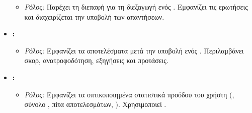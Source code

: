 \begin{itemize}[leftmargin=*, noitemsep]
        \begin{itemize}[leftmargin=+, noitemsep]
            \item \textit{Ρόλος:} Παρέχει τη διεπαφή για τη διεξαγωγή ενός . Εμφανίζει τις ερωτήσεις και διαχειρίζεται την υποβολή των απαντήσεων.
        \end{itemize}
    \item \textbf{\texttt{}:}
        \begin{itemize}[leftmargin=+, noitemsep]
            \item \textit{Ρόλος:} Εμφανίζει τα αποτελέσματα μετά την υποβολή ενός . Περιλαμβάνει σκορ, ανατροφοδότηση, εξηγήσεις και προτάσεις.
        \end{itemize}
    \item \textbf{\texttt{}:}
        \begin{itemize}[leftmargin=+, noitemsep]
            \item \textit{Ρόλος:} Εμφανίζει τα οπτικοποιημένα στατιστικά προόδου του χρήστη (, σύνολο , πίτα αποτελεσμάτων, ). Χρησιμοποιεί .
        \end{itemize}
\end{itemize}